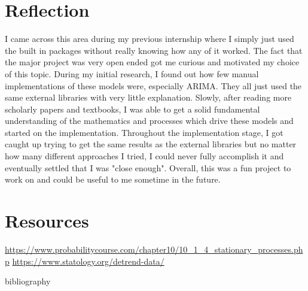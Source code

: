 \documentclass{article}
\begin{document}
  \section{Reflection}
  I came across this area during my previous internship where I simply just used the built in packages without really knowing how any of it worked. The fact that the major project was very open ended got me curious and motivated my choice of this topic. During my initial research, I found out how few manual implementations of these models were, especially ARIMA. They all just used the same external libraries with very little explanation. Slowly, after reading more scholarly papers and textbooks, I was able to get a solid fundamental understanding of the mathematics and processes which drive these models and started on the implementation. Throughout the implementation stage, I got caught up trying to get the same results as the external libraries but no matter how many different approaches I tried, I could never fully accomplish it and eventually settled that I was "close enough". Overall, this was a fun project to work on and could be useful to me sometime in the future.

  \section{Resources}
  \url{https://www.probabilitycourse.com/chapter10/10_1_4_stationary_processes.php}
  \url{https://www.statology.org/detrend-data/}

  bibliography\cite{articleFactCheck}
  \printbibliography
\end{document}
